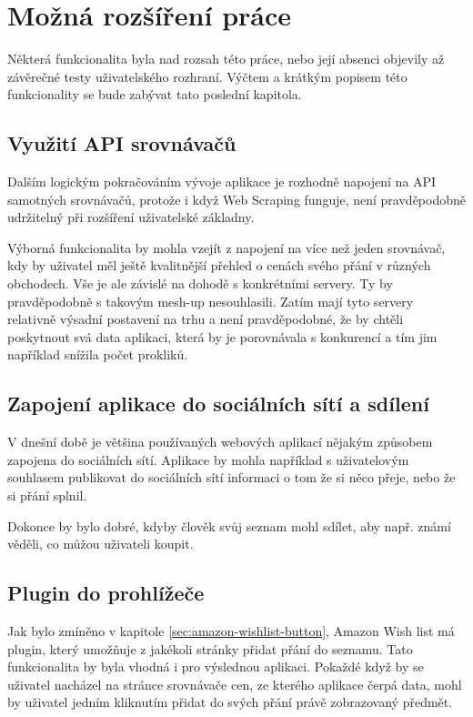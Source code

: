 \chapter{Možná rozšíření práce}
Některá funkcionalita byla nad rozsah této práce, nebo její absenci objevily až závěrečné testy uživatelského rozhraní. Výčtem a krátkým popisem této funkcionality se bude zabývat tato poslední kapitola.

\section{Využití API srovnávačů}
Dalším logickým pokračováním vývoje aplikace je rozhodně napojení na API samotných srovnávačů, protože i když Web Scraping funguje, není pravděpodobně udržitelný při rozšíření uživatelské základny.

Výborná funkcionalita by mohla vzejít z napojení na více než jeden srovnávač, kdy by uživatel měl ještě kvalitnější přehled o cenách svého přání v různých obchodech. Vše je ale závislé na dohodě s konkrétními servery. Ty by pravděpodobně s takovým mesh-up nesouhlasili. Zatím mají tyto servery relativně výsadní postavení na trhu a není pravděpodobné, že by chtěli poskytnout svá data aplikaci, která by je porovnávala s konkurencí a tím jim například snížila počet prokliků.

\section{Zapojení aplikace do sociálních sítí a sdílení}
V dnešní době je většina používaných webových aplikací nějakým způsobem zapojena do sociálních sítí. Aplikace by mohla například s uživatelovým souhlasem publikovat do sociálních sítí informaci o tom že si něco přeje, nebo že si přání splnil.

Dokonce by bylo dobré, kdyby člověk svůj seznam mohl sdílet, aby např. známí věděli, co můžou uživateli koupit.

\section{Plugin do prohlížeče}
Jak bylo zmíněno v kapitole \ref{sec:amazon-wishlist-button}, Amazon Wish list má plugin, který umožňuje z jakékoli stránky přidat přání do seznamu. Tato funkcionalita by byla vhodná i pro výslednou aplikaci. Pokaždé když by se uživatel nacházel na stránce srovnávače cen, ze kterého aplikace čerpá data, mohl by uživatel jedním kliknutím přidat do svých přání právě zobrazovaný předmět.

